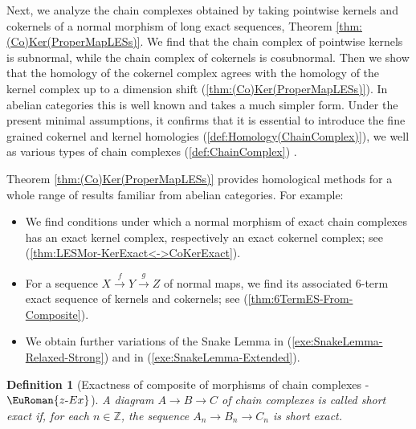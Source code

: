 \documentclass [12pt,oneside]{book}%
\theoremstyle{captionstyle}  %
\newtheorem{definition}[theorem]{Definition}
\newenvironment{ulist}{			%
	\begin{itemize}}{
	\end{itemize}
}
\newcommand{\Defn}[1]{\emph{#1}}
\newcommand{\hy}{\text{-}}													%
\newcommand{\XRA}[1]{\xrightarrow{\ #1\ }}
\newcommand{\ZNr}{\mathbb{Z}}		%
\newcommand{\ZExactTag}{ - {\color{Cerulean} $\EuRoman{z\hy Ex}$}}
\begin{document}
Next, we analyze the chain complexes obtained by taking  pointwise kernels and cokernels of a normal morphism of long exact sequences, Theorem \ref{thm:(Co)Ker(ProperMapLESs)}. We find that the chain complex of pointwise kernels is subnormal, while the chain complex of cokernels is cosubnormal. Then we show that the homology of the cokernel complex agrees with the homology of the kernel complex up to a dimension shift (\ref{thm:(Co)Ker(ProperMapLESs)}). In abelian categories this is well known and takes a much simpler form. Under the present minimal assumptions, it confirms that it is essential to introduce the fine grained cokernel and kernel homologies (\ref{def:Homology(ChainComplex)}), we well as various types of chain complexes (\ref{def:ChainComplex}) .

Theorem \ref{thm:(Co)Ker(ProperMapLESs)} provides homological methods for a whole range of results familiar from abelian categories. For example:
\begin{ulist}
    \item We find conditions under which a normal morphism of exact chain complexes has an exact kernel complex, respectively an exact cokernel complex; see (\ref{thm:LESMor-KerExact<->CoKerExact}).
    \item For a sequence $X\XRA{f} Y \XRA{g} Z$ of normal maps, we find its associated $6$-term exact sequence of kernels and cokernels; see (\ref{thm:6TermES-From-Composite}).
    \item We obtain further variations of the Snake Lemma in (\ref{exe:SnakeLemma-Relaxed-Strong}) and in (\ref{exe:SnakeLemma-Extended}).
\end{ulist}

\begin{definition}[Exactness of composite of morphisms of chain complexes\ZExactTag]
    \label{def:Exactness-MapsOfChainComplexes}%
    A diagram $A\to B\to C$ of chain complexes is called \Defn{short exact} if, for each $n\in \ZNr$, the sequence $A_n\to B_n\to C_n$ is short exact. %
\end{definition}
\end{document}
